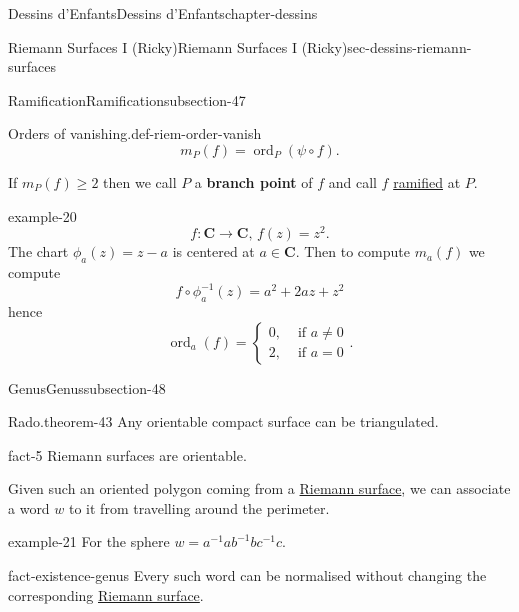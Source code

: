 \documentclass[oneside,10pt,]{book}
\newcommand{\terminology}[1]{\textbf{#1}}
\numberwithin{equation}{section}
\newcommand{\inv}{^{-1}}
\newcommand{\CC}{\mathbf{C}}
\DeclareMathOperator{\ord}{ord}
\newcommand{\amp}{&}
\begin{document}
\begin{chapterptx}{Dessins d'Enfants}{}{Dessins d'Enfants}{}{}{chapter-dessins}
\begin{sectionptx}{Riemann Surfaces I (Ricky)}{}{Riemann Surfaces I (Ricky)}{}{}{sec-dessins-riemann-surfaces}
\begin{subsectionptx}{Ramification}{}{Ramification}{}{}{subsection-47}
\begin{definition}{Orders of vanishing.}{def-riem-order-vanish}
\begin{equation*}
m_P(f) = \ord_P(\psi\circ f)\text{.}
\end{equation*}
%
\par
\hypertarget{p-499}{}%
If \(m_P(f)\ge 2\) then we call \(P\) a \terminology{branch point} of \(f\) and call \(f\) \hyperref[def-dess-ramified]{ramified} at \(P\).%
\end{definition}
\begin{example}{}{example-20}%
\hypertarget{p-500}{}%
%
\begin{equation*}
f\colon \CC \to \CC,\,f(z) = z^2\text{.}
\end{equation*}
The chart \(\phi_a(z) = z-a\) is centered at \(a \in \CC\). Then to compute \(m_a(f)\) we compute%
\begin{equation*}
f\circ \phi\inv_a(z) = a^2 + 2az + z^2
\end{equation*}
hence%
\begin{equation*}
\ord_a(f) =\begin{cases} 0,\amp \text{ if } a\ne 0\\ 2,\amp\text{ if } a= 0\end{cases}\text{.}
\end{equation*}
%
\end{example}
\end{subsectionptx}
%
%
\typeout{************************************************}
\typeout{************************************************}
%
\begin{subsectionptx}{Genus}{}{Genus}{}{}{subsection-48}
\begin{theorem}{Rado.}{}{theorem-43}%
\hypertarget{p-501}{}%
Any orientable compact surface can be triangulated.%
\end{theorem}
\begin{fact}{}{}{fact-5}%
\hypertarget{p-502}{}%
Riemann surfaces are orientable.%
\end{fact}
\hypertarget{p-503}{}%
Given such an oriented polygon coming from a \hyperref[def-top-riem-surface]{Riemann surface}, we can associate a word \(w\) to it from travelling around the perimeter.%
\begin{example}{}{example-21}%
\hypertarget{p-504}{}%
For the sphere \(w = a\inv ab\inv bc\inv c\).%
\end{example}
\begin{fact}{}{}{fact-existence-genus}%
\hypertarget{p-505}{}%
Every such word can be normalised without changing the corresponding \hyperref[def-top-riem-surface]{Riemann surface}.%
\begin{equation*}

\end{equation*}
\end{fact}
\end{subsectionptx}
\end{sectionptx}
\end{chapterptx}
\end{document}
